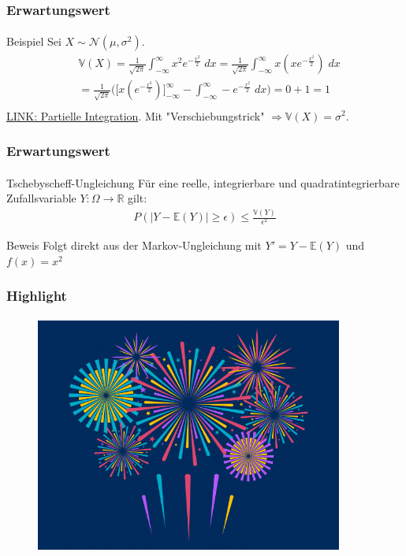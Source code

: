 \documentclass{beamer}
\begin{document}
\begin{frame}
    \frametitle{Erwartungswert}
\framesubtitle{}
\begin{block}{Beispiel}
Sei $X \sim \mathcal{N}(\mu, \sigma^2)$.
\begin{align*}
&\mathbb{V} (X) =  \frac{1}{\sqrt{2 \pi}} \int_{- \infty}^{\infty} x^2 e^{- \frac{x^2}{2}} \; dx =   \frac{1}{\sqrt{2 \pi}} \int_{- \infty}^{\infty} x (xe^{- \frac{x^2}{2}}) \; dx \\
& =  \frac{1}{\sqrt{2 \pi}} \biggl (\biggl [ x (e^{- \frac{x^2}{2}}) \biggr]_{- \infty}^{\infty}   - \int_{- \infty}^{\infty}  - e^{- \frac{x^2}{2}} \; dx  \biggr) = 0 + 1 = 1\\
\end{align*}
\href{https://de.wikipedia.org/wiki/Partielle_Integration}{LINK: Partielle Integration}. Mit "Verschiebungstrick"
$\Rightarrow \mathbb{V}(X) = \sigma^2$.
\end{block}
 \end{frame}


\begin{frame}
    \frametitle{Erwartungswert}
\framesubtitle{}
\begin{block}{Tschebyscheff-Ungleichung}
Für eine reelle, integrierbare und quadratintegrierbare  Zufallsvariable $Y : \Omega \to \mathbb{R}$  gilt:
\begin{align*}
P (|Y  - \mathbb{E} (Y)|  \geq \epsilon) \leq \frac{\mathbb{V} (Y)}{ \epsilon^2} 
\end{align*}
\end{block}
\begin{block}{Beweis}
Folgt direkt aus der Markov-Ungleichung mit $Y' = Y -\mathbb{E}(Y)$ und $f(x) = x^2$
\end{block}
 \end{frame}


\begin{frame}
    \frametitle{Highlight}
\framesubtitle{}
\begin{figure}[htp]
      \centering
    \includegraphics[width=0.9\textwidth]{img/firework}
\end{figure}
 \end{frame}
\end{document}
